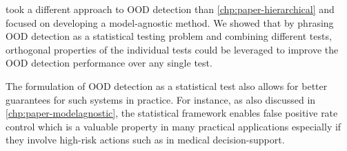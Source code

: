 
\vspace{1em}
\textbf{} took a different approach to OOD detection than \cref{chp:paper-hierarchical} and focused on developing a model-agnostic method. 
We showed that by phrasing OOD detection as a statistical testing problem and combining different tests, orthogonal properties of the individual tests could be leveraged to improve the OOD detection performance over any single test.

The formulation of OOD detection as a statistical test also allows for better guarantees for such systems in practice. For instance, as also discussed in \cref{chp:paper-modelagnostic}, the statistical framework enables false positive rate control which is a valuable property in many practical applications especially if they involve high-risk actions such as in medical decision-support. 





